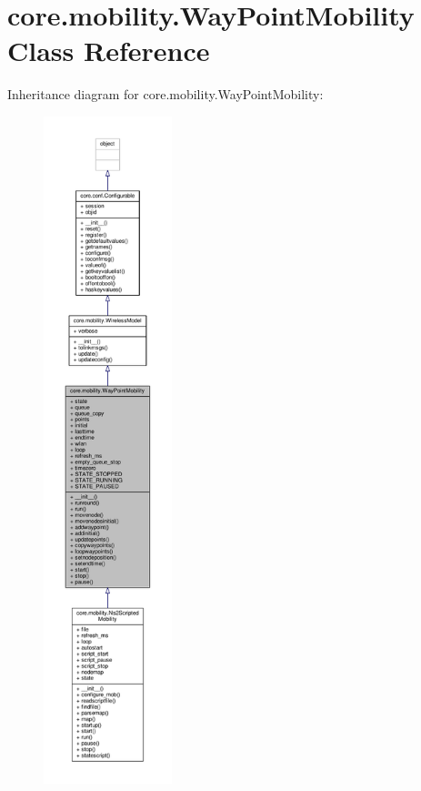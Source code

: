 \hypertarget{classcore_1_1mobility_1_1_way_point_mobility}{\section{core.\+mobility.\+Way\+Point\+Mobility Class Reference}
\label{classcore_1_1mobility_1_1_way_point_mobility}
}


Inheritance diagram for core.\+mobility.\+Way\+Point\+Mobility\+:
\nopagebreak
\begin{figure}[H]
\begin{center}
\leavevmode
\includegraphics[height=550pt]{classcore_1_1mobility_1_1_way_point_mobility__inherit__graph}
\end{center}
\end{figure}


